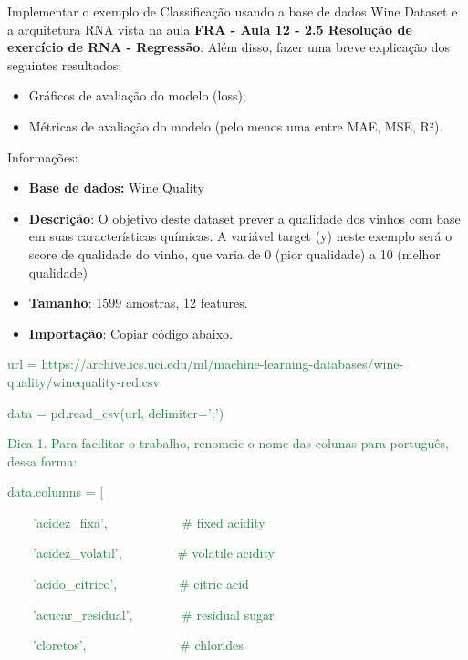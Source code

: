 Implementar o exemplo de Classificação usando a base de dados Wine Dataset e a arquitetura RNA vista na aula \textbf{FRA
- Aula 12 - 2.5 Resolução de exercício de RNA - Regressão}. Além disso, fazer uma breve explicação dos seguintes
resultados: 

\begin{itemize}
\item Gráficos de avaliação do modelo (loss);
\item Métricas de avaliação do modelo (pelo menos uma entre MAE, MSE, R²).
\end{itemize}
Informações:

\begin{itemize}
\item \textbf{Base de dados: }Wine Quality
\item \textbf{Descrição}: O objetivo deste dataset prever a qualidade dos vinhos com base em suas características
químicas. A variável target (y) neste exemplo será o score de qualidade do vinho, que varia de 0 (pior qualidade) a 10
(melhor qualidade)
\item \textbf{Tamanho}: 1599 amostras, 12 features.
\end{itemize}
\begin{itemize}
\item \textbf{Importação}: Copiar código abaixo.
\end{itemize}

\foreignlanguage{english}{\textcolor[HTML]{188038}{url =
{\textquotedbl}https://archive.ics.uci.edu/ml/machine-learning-databases/wine-quality/winequality-red.csv{\textquotedbl}}}

\textcolor[HTML]{188038}{data = pd.read\_csv(url, delimiter=';')}


\textcolor[HTML]{188038}{Dica 1. Para facilitar o trabalho, renomeie o nome das colunas para português, dessa forma:}


\textcolor[HTML]{188038}{data.columns = [}

\textcolor[HTML]{188038}{\ \ \ \ {}'acidez\_fixa', \ \ \ \ \ \ \ \ \ \ \ \# fixed acidity}

\textcolor[HTML]{188038}{\ \ \ \ {}'acidez\_volatil', \ \ \ \ \ \ \ \ \# volatile acidity}

\textcolor[HTML]{188038}{\ \ \ \ {}'acido\_citrico', \ \ \ \ \ \ \ \ \ \# citric acid}

\textcolor[HTML]{188038}{\ \ \ \ {}'acucar\_residual', \ \ \ \ \ \ \ \# residual sugar}

\textcolor[HTML]{188038}{\ \ \ \ {}'cloretos', \ \ \ \ \ \ \ \ \ \ \ \ \ \ \# chlorides}

